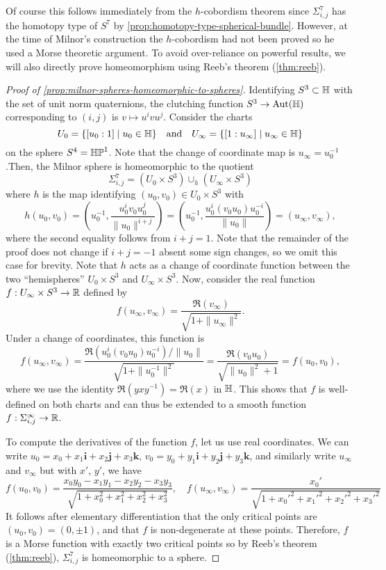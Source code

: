 Of course this follows immediately from the $h$-cobordism theorem since $\Sigma_{i,j}^7$ has the homotopy type of $S^7$ by \cref{prop:homotopy-type-spherical-bundle}. However, at the time of Milnor's construction the $h$-cobordism had not been proved so he used a Morse theoretic argument. To avoid over-reliance on powerful results, we will also directly prove homeomorphism using Reeb's theorem (\cref{thm:reeb}).

\begin{proof}[Proof of \cref{prop:milnor-spheres-homeomorphic-to-spheres}]
	Identifying $S^3\subset \mathbb{H}$ with the set of unit norm quaternions, the clutching function $S^3 \to \operatorname{Aut}(\mathbb{H})$ corresponding to $(i,j)$ is $v\mapsto u^ivu^j$. Consider the charts
	\[
		U_0 = \{ [u_0:1] \mid u_0\in \mathbb{H}\}\quad\textrm{and}\quad U_\infty = \{ [1:u_\infty] \mid u_\infty\in \mathbb{H}\}
	\]
	on the sphere $S^4=\mathbb{HP}^1$. Note that the change of coordinate map is $u_\infty=u_0^{-1}$.Then, the Milnor sphere is homeomorphic to the quotient
	\[
		\Sigma^7_{i,j} = (U_0 \times S^3)\cup_h (U_\infty\times S^3)
	\]
	where $h$ is the map identifying $(u_0,v_0)\in U_0\times S^3$ with
	\[
		h(u_0,v_0)= \left(u_0^{-1}, \frac{u_0^iv_0u_0^j}{\|u_0\|^{i+j}}\right) = \left(u_0^{-1}, \frac{u_0^i (v_0u_0) u_0^{-i}}{\|u_0\|}\right) = (u_\infty, v_\infty),
	\]
	where the second equality follows from $i+j=1$. Note that the remainder of the proof does not change if $i+j=-1$ absent some sign changes, so we omit this case for brevity.
	Note that $h$ acts as a change of coordinate function between the two ``hemispheres'' $U_0\times S^3$ and $U_\infty\times S^3$.
	Now, consider the real function $f : U_\infty\times S^3\to \mathbb{R}$ defined by
	\[
		f(u_\infty, v_\infty) = \frac{\Re(v_\infty)}{\sqrt{1+\|u_\infty\|^2}}.
	\]
	Under a change of coordinates, this function is
	\[
		f(u_\infty, v_\infty) = \frac{\Re(u_0^i(v_0u_0)u_0^{-i})/\|u_0\|}{\sqrt{1+\|u_0^{-1}\|^2}} = \frac{\Re(v_0u_0)}{\sqrt{\|u_0\|^2+1}}=f(u_0,v_0),
	\]
	where we use the identity $\Re(yxy^{-1})=\Re(x)$ in $\mathbb{H}$. This shows that $f$ is well-defined on both charts and can thus be extended to a smooth function $f : \Sigma^\infty_{i,j} \to \mathbb{R}$.

	To compute the derivatives of the function $f$, let us use real coordinates. We can write $u_0=x_0+x_1\bm{i}+x_2\bm{j}+x_3\bm{k}$, $v_0 = y_0+y_1\bm{i}+y_2\bm{j}+y_3\bm{k}$, and similarly write $u_\infty$ and $v_\infty$ but with $x'$, $y'$, we have
	\[
		f(u_0, v_0) = \frac{x_0y_0 - x_1y_1 - x_2y_2 - x_3y_3}{\sqrt{1+x_0^2+x_1^2+x_2^2+x_3^2}},\quad
		f(u_\infty, v_\infty) = \frac{x_0'}{\sqrt{1+x_0'^2+x_1'^2+x_2'^2+x_3'^2}}
	\]
	It follows after elementary differentiation that the only critical points are $(u_0, v_0)= (0,\pm 1)$, and that $f$ is non-degenerate at these points. Therefore, $f$ is a Morse function with exactly two critical points so by Reeb's theorem (\ref{thm:reeb}), $\Sigma_{i,j}^7$ is homeomorphic to a sphere.
\end{proof}

